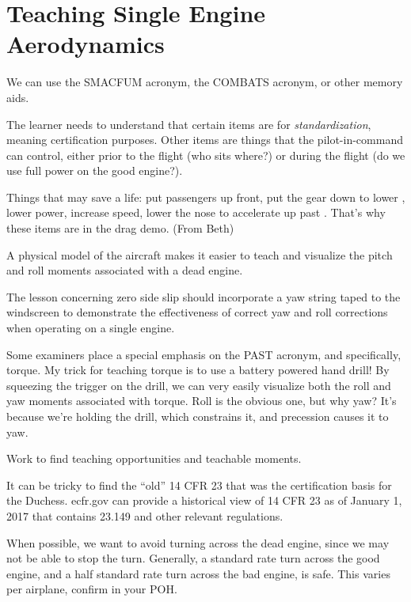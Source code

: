 \section{Teaching Single Engine Aerodynamics}

We can use the SMACFUM acronym, the COMBATS acronym, or other memory aids.

The learner needs to understand that certain items are for \emph{standardization}, meaning
certification purposes. Other items are things that the pilot-in-command can control, either prior
to the flight (who sits where?) or during the flight (do we use full power on the good engine?).

Things that may save a life: put passengers up front, put the gear down to lower \vmc, lower power, increase speed, lower the nose to accelerate up past \vmc. That's why these items are in the drag demo. (From Beth)

A physical model of the aircraft makes it easier to teach and visualize the pitch and roll moments
associated with a dead engine.

The lesson concerning zero side slip should incorporate a yaw string taped to the windscreen to demonstrate
the effectiveness of correct yaw and roll corrections when operating on a single engine.

Some examiners place a special emphasis on the PAST acronym, and specifically, torque. My trick for teaching torque
is to use a battery powered hand drill! By squeezing the trigger on the drill, we can very easily visualize both the
roll and yaw moments associated with torque. Roll is the obvious one, but why yaw? It's because we're holding
the drill, which constrains it, and precession causes it to yaw.

Work to find teaching opportunities and teachable moments.

It can be tricky to find the ``old'' 14 CFR 23 that was the certification basis for the Duchess. ecfr.gov can provide
a historical view of 14 CFR 23 as of January 1, 2017 that contains 23.149 and other relevant regulations.

When possible, we want to avoid turning across the dead engine, since we may not be able to
stop the turn. Generally, a standard rate turn across the good engine, and a half standard rate turn across
the bad engine, is safe. This varies per airplane, confirm in your POH.


